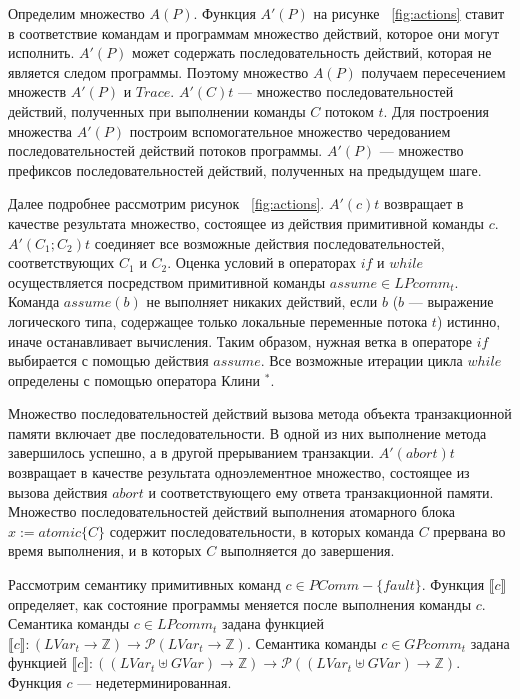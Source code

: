 Определим множество $A(P)$. Функция $A'(P)$ на рисунке ~\ref{fig:actions} ставит в соответствие командам и программам множество действий, которое они могут исполнить. $A'(P)$ может содержать последовательность действий, которая не является следом программы. Поэтому множество $A(P)$ получаем пересечением множеств $A'(P)$ и $Trace$. $A'(C)t$ --- множество последовательностей действий, полученных при выполнении команды $C$ потоком $t$. Для построения множества $A'(P)$ построим вспомогательное множество чередованием последовательностей действий потоков программы. $A'(P)$ --- множество префиксов последовательностей действий, полученных на предыдущем шаге.

Далее подробнее рассмотрим рисунок ~\ref{fig:actions}. $A'(c)t$ возвращает в качестве результата множество, состоящее из действия примитивной команды $c$. $A'(C_1;C_2)t$ соединяет все возможные действия последовательностей, соответствующих $C_1$ и $C_2$. Оценка условий в операторах $if$ и $while$ осуществляется посредством примитивной команды $assume \in LPcomm_t$. Команда $assume(b)$ не выполняет никаких действий, если $b$ ($b$ --- выражение логического типа, содержащее только локальные переменные потока $t$) истинно, иначе останавливает вычисления. Таким образом, нужная ветка в операторе $if$ выбирается с помощью действия $assume$. Все возможные итерации цикла $while$ определены с помощью оператора Клини $^*$.

Множество последовательностей действий вызова метода объекта транзакционной памяти включает две последовательности. В одной из них выполнение метода завершилось успешно, а в другой прерыванием транзакции. $A'(abort)t$ возвращает в качестве результата одноэлементное множество, состоящее из вызова действия $abort$ и соответствующего ему ответа транзакционной памяти. Множество последовательностей действий выполнения атомарного блока $x := atomic\{C\}$ содержит последовательности, в которых команда $C$ прервана во время выполнения, и в которых $C$ выполняется до завершения.

Рассмотрим семантику примитивных команд $c \in PComm - \{fault\}$. Функция $\llbracket c \rrbracket$ определяет, как состояние программы меняется после выполнения команды $c$. Семантика команды $c \in LPcomm_t$ задана функцией $\llbracket c \rrbracket: (LVar_t \to \mathbb{Z}) \to \mathcal{P}(LVar_t \to \mathbb{Z})$. Семантика команды $c \in GPcomm_t$ задана функцией $\llbracket c \rrbracket: ((LVar_t \uplus GVar) \to \mathbb{Z}) \to \mathcal{P}((LVar_t \uplus GVar)  \to \mathbb{Z})$. Функция $c$ --- недетерминированная.

